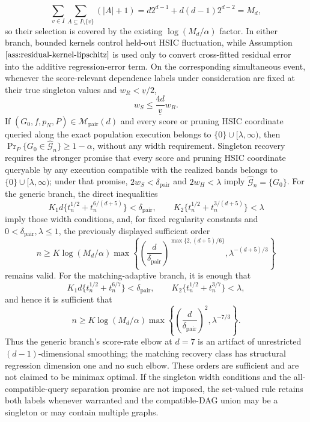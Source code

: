 \[
 \sum_{v\in I}\sum_{A\subseteq I\setminus\{v\}}(|A|+1)
 =d2^{d-1}+d(d-1)2^{d-2}=M_d,
\]
so their selection is covered by the existing \(\log(M_d/\alpha)\) factor. In either branch, bounded kernels control held-out HSIC fluctuation, while Assumption \(\ref{ass:residual-kernel-lipschitz}\) is used only to convert cross-fitted residual error into the additive regression-error term. On the corresponding simultaneous event, whenever the score-relevant dependence labels under consideration are fixed at their true singleton values and \(w_R<\underline v/2\),
\[
 w_S\le \frac{4d}{\underline v}w_R.
\]
If \((G_0,f,p_N,P)\in\mathcal M_{\mathrm{pair}}(d)\) and every score or pruning HSIC coordinate queried along the exact population execution belongs to \(\{0\}\cup[\lambda,\infty)\), then \(\Pr_P\{G_0\in\widehat{\mathcal G}_n\}\ge1-\alpha\), without any width requirement. Singleton recovery requires the stronger promise that every score and pruning HSIC coordinate queryable by any execution compatible with the realized bands belongs to \(\{0\}\cup[\lambda,\infty)\); under that promise, \(2w_S<\delta_{\mathrm{pair}}\) and \(2w_H<\lambda\) imply \(\widehat{\mathcal G}_n=\{G_0\}\). For the generic branch, the direct inequalities
\[
 K_1d\{t_n^{1/2}+t_n^{6/(d+5)}\}<\delta_{\mathrm{pair}},
 \qquad
 K_2\{t_n^{1/2}+t_n^{3/(d+5)}\}<\lambda
\]
imply those width conditions, and, for fixed regularity constants and \(0<\delta_{\mathrm{pair}},\lambda\le1\), the previously displayed sufficient order
\[
 n\ge K\log(M_d/\alpha)
 \max\left\{
 \left(\frac d{\delta_{\mathrm{pair}}}\right)^{\max\{2,(d+5)/6\}},
 \lambda^{-(d+5)/3}
 \right\}
\]
remains valid. For the matching-adaptive branch, it is enough that
\[
 K_1d\{t_n^{1/2}+t_n^{6/7}\}<\delta_{\mathrm{pair}},
 \qquad
 K_2\{t_n^{1/2}+t_n^{3/7}\}<\lambda,
\]
and hence it is sufficient that
\[
 n\ge K\log(M_d/\alpha)
 \max\left\{
 \left(\frac d{\delta_{\mathrm{pair}}}\right)^2,
 \lambda^{-7/3}
 \right\}.
\]
Thus the generic branch's score-rate elbow at \(d=7\) is an artifact of unrestricted \((d-1)\)-dimensional smoothing; the matching recovery class has structural regression dimension one and no such elbow. These orders are sufficient and are not claimed to be minimax optimal. If the singleton width conditions and the all-compatible-query separation promise are not imposed, the set-valued rule retains both labels whenever warranted and the compatible-DAG union may be a singleton or may contain multiple graphs.
